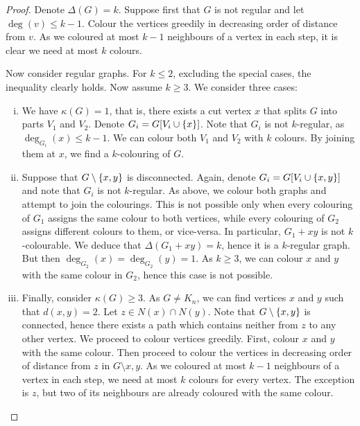 \begin{proof}
Denote $\Delta(G) = k$. Suppose first that $G$ is not regular and
let $\deg(v) \leq k-1$. Colour the vertices greedily in decreasing
order of distance from $v$. As we coloured at most $k-1$ neighbours
of a vertex in each step, it is clear we need at most $k$ colours.

Now consider regular graphs. For $k \leq 2$, excluding the special
cases, the inequality clearly holds. Now assume $k \geq 3$. We
consider three cases:

\begin{enumerate}[i)]
\item We have $\kappa(G) = 1$, that is, there exists a cut vertex
$x$ that splits $G$ into parts $V_1$ and $V_2$. Denote
$G_i = G[V_i \cup \left\{x\right\}]$. Note that $G_i$ is not $k$-regular,
as $\deg_{G_i}(x) \leq k-1$. We can colour both $V_1$ and $V_2$
with $k$ colours. By joining them at $x$, we find a $k$-colouring
of $G$.

\item Suppose that $G \setminus \left\{x,y\right\}$ is disconnected. Again,
denote $G_i = G[V_i \cup \left\{x,y\right\}]$ and note that $G_i$ is not
$k$-regular. As above, we colour both graphs and attempt to join
the colourings. This is not possible only when every colouring of
$G_1$ assigns the same colour to both vertices, while every
colouring of $G_2$ assigns different colours to them, or
vice-versa. In particular, $G_1 + xy$ is not $k$-colourable. We
deduce that $\Delta(G_1 + xy) = k$, hence it is a $k$-regular
graph. But then $\deg_{G_2}(x) = \deg_{G_2}(y) = 1$. As $k \geq 3$,
we can colour $x$ and $y$ with the same colour in $G_2$, hence
this case is not possible.

\item Finally, consider $\kappa(G) \geq 3$. As $G \ne K_n$, we can
find vertices $x$ and $y$ such that $d(x,y) = 2$. Let
$z \in N(x) \cap N(y)$. Note that $G \setminus \left\{x,y\right\}$ is
connected, hence there exists a path which contains neither from
$z$ to any other vertex. We proceed to colour vertices greedily.
First, colour $x$ and $y$ with the same colour. Then proceed to
colour the vertices in decreasing order of distance from $z$ in
$G \setminus{x,y}$. As we coloured at most $k-1$ neighbours of a
vertex in each step, we need at most $k$ colours for every vertex.
The exception is $z$, but two of its neighbours are already
coloured with the same colour. \qedhere
\end{enumerate}
\end{proof}


